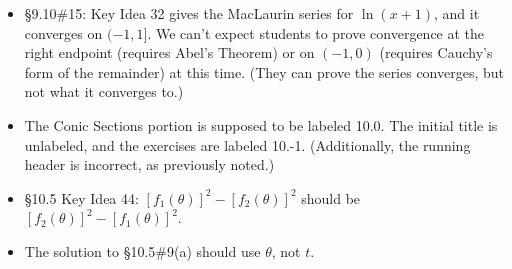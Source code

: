 \documentclass{amsart}
\begin{document}
\begin{itemize}
\item \S9.10\#15: Key Idea 32 gives the MacLaurin series for $\ln(x+1)$, and it converges on $(-1,1]$.  We can't expect students to prove convergence at the right endpoint (requires Abel's Theorem) or on $(-1,0)$ (requires Cauchy's form of the remainder) at this time.  (They can prove the series converges, but not what it converges to.)
\item The Conic Sections portion is supposed to be labeled 10.0.  The initial title is unlabeled, and the exercises are labeled 10.-1.  (Additionally, the running header is incorrect, as previously noted.)
\item \S10.5 Key Idea 44: $[f_1(\theta)]^2 - [f_2(\theta)]^2$ should be $[f_2(\theta)]^2 - [f_1(\theta)]^2$.
\item The solution to \S10.5\#9(a) should use $\theta$, not $t$.
\end{itemize}

\clearpage
\end{document}
